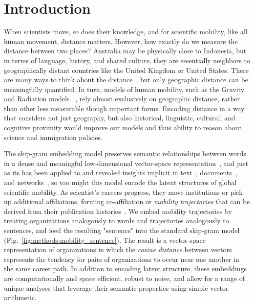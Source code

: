 \documentclass[12pt]{article} %
\begin{document}
%
%
\section{Introduction}\label{sec:introduction} %


When scientists move, so does their knowledge, and for scientific mobility, like all human movement, distance matters.
However, how exactly do we measure the distance between two places?
Australia may be physically close to Indonesia, but in terms of language, history, and shared culture, they are essentially neighbors to geographically distant countries like the United Kingdom or United States.
There are many ways to think about the distance~\autocite{boschma2005proximity}, but only geographic distance can be meaningfully quantified.
In turn, models of human mobility, such as the Gravity~\autocite{zipf1946gravity} and Radiation models ~\autocite{simini2012universal}, rely almost exclusively on geographic distance, rather than other less measurable though important forms.
Encoding distance in a way that considers not just geography, but also historical, linguistic, cultural, and cognitive proximity would improve our models and thus ability to reason about science and immigration policies.

The skip-gram embedding model preserves semantic relationships between words in a dense and meaningful low-dimensional vector-space representation~\cite{mikolov2013word2vec}, and just as its has been applied to and revealed insights implicit in text~\cite{linzhuo2020hyperbolic, tshitoyan2019mat2vec, garg2018gender, kozlowski2018geometry}, documents~\autocite{le2014doc2vec, nakandala2016twitch}, and networks~\autocite{perozzi2014deepwalk, grover2016node2vec}, so too might this model encode the latent structures of global scientific mobility.
As scientist's careers progress, they move institutions or pick up additional affiliations, forming co-affiliation or \textit{mobility trajectories} that can be derived from their publication histories~\autocite{robinson2019mobility, sugimoto2017mostimpact}.
We embed mobility trajectories by treating organizations analogously to words and trajectories analogously to sentences, and feed the resulting "sentence" into the standard skip-gram model (Fig.~\ref{fig:methods:mobility_sentence}).
The result is a vector-space representation of organizations in which the \textit{cosine distance} between vectors represents the tendency for pairs of organizations to occur near one another in the same career path.
In addition to encoding latent structure, these embeddings are computationally and space efficient, robust to noise, and allow for a range of unique analyses that leverage their semantic properties using simple vector arithmetic.
\end{document}
